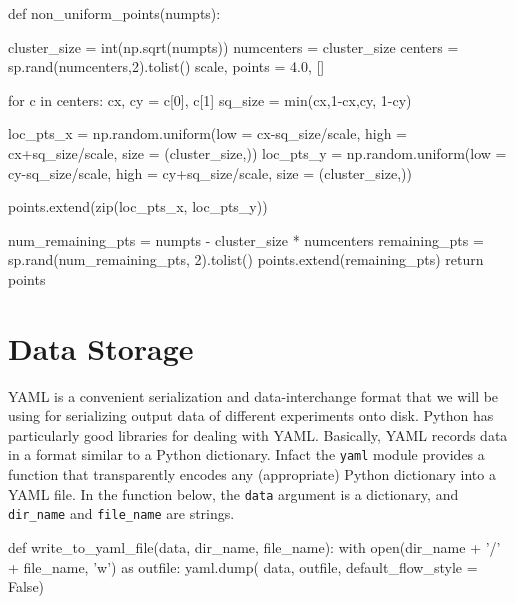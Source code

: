 def non_uniform_points(numpts):

    cluster_size = int(np.sqrt(numpts)) 
    numcenters   = cluster_size
    centers      = sp.rand(numcenters,2).tolist()
    scale, points = 4.0, []

    for c in centers:
        cx, cy = c[0], c[1]
        sq_size      = min(cx,1-cx,cy, 1-cy)

        loc_pts_x    = np.random.uniform(low  = cx-sq_size/scale, 
                                         high = cx+sq_size/scale, 
                                         size = (cluster_size,))
        loc_pts_y    = np.random.uniform(low = cy-sq_size/scale, 
                                         high = cy+sq_size/scale, 
                                         size = (cluster_size,))

        points.extend(zip(loc_pts_x, loc_pts_y))

    num_remaining_pts = numpts - cluster_size * numcenters
    remaining_pts = sp.rand(num_remaining_pts, 2).tolist()
    points.extend(remaining_pts)
    return points
\nwendcode{}\nwdocspar

\section{Data Storage}
YAML\cite{ben2009yaml} is a convenient serialization and data-interchange format that we will be using 
for serializing output data of different experiments onto disk. Python has particularly good libraries for dealing with YAML. Basically, 
YAML records data in a format similar to a Python dictionary. Infact the \texttt{yaml} module provides a function that
transparently encodes any (appropriate) Python dictionary into a YAML file. In the function below, the 
\texttt{data} argument is a dictionary, and \texttt{dir\_name} and \texttt{file\_name} are strings. 
 
\nwenddocs{}\endmoddef\nwstartdeflinemarkup{}\nwenddeflinemarkup
def write_to_yaml_file(data, dir_name, file_name):
   with open(dir_name + '/' + file_name, 'w') as outfile:
          yaml.dump( data, outfile, default_flow_style = False)
\nwendcode{}\nwdocspar


